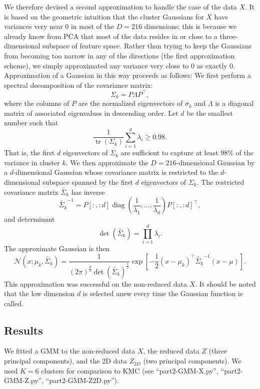 \documentclass[12pt]{article}
\begin{document}
We therefore devised a second approximation to handle the case of the data $X$. It is based on the geometric intuition that the cluster Gaussians for $X$ have variances very near $0$ in most of the $D=216$ dimensions; this is because we already know from PCA that most of the data resides in or close to a three-dimensional subspace of feature space. Rather than trying to keep the Gaussians from becoming too narrow in any of the directions (the first approximation scheme), we simply approximated any variance very close to $0$ as exactly $0$. Approximation of a Gaussian in this way proceeds as follows: We first perform a spectral decomposition of the covariance matrix:
\[ \Sigma_k = P \Lambda P^\top, \]
where the columns of $P$ are the normalized eigenvectors of $\sigma_k$ and $\Lambda$ is a diagonal matrix of associated eigenvalues in descending order. Let $d$ be the smallest number such that
\[ \frac{1}{\operatorname{tr}(\Sigma_k)}\sum_{i=1}^d \lambda_i \geq 0.98. \]
That is, the first $d$ eigenvectors of $\Sigma_k$ are sufficient to capture at least 98\% of the variance in cluster $k$. We then approximate the $D=216$-dimensional Gaussian by a $d$-dimensional Gaussian whose covariance matrix is restricted to the $d$-dimensional subspace spanned by the first $d$ eigenvectors of $\Sigma_k$. The restricted covariance matrix $\tilde{\Sigma_k}$ has inverse
\[ \tilde{\Sigma_k}^{-1} = P[:, :d] \operatorname{diag}\left(\frac{1}{\lambda_1},\ldots,\frac{1}{\lambda_d}\right) P[:, :d]^\top, \]
and determinant
\[ \operatorname{det}(\tilde{\Sigma_k}) = \prod_{i=1}^d \lambda_i. \]
The approximate Gaussian is then
\[ \mathcal{N}(x; \mu_k, \tilde{\Sigma_k}) = \frac{1}{(2\pi)^{\frac{d}{2}}\operatorname{det}(\tilde{\Sigma_k})^{\frac{1}{2}}}\exp\left[-\frac{1}{2}(x-\mu_k)^\top\tilde{\Sigma_k}^{-1}(x-\mu)\right]. \]
This approximation was successful on the non-reduced data $X$. It should be noted that the low dimension $d$ is selected anew every time the Gaussian function is called.

\subsection{Results}

We fitted a GMM to the non-reduced data $X$, the reduced data $Z$ (three principal components), and the 2D data $Z_{2D}$ (two principal components). We used $K=6$ clusters for comparison to KMC (see ``part2-GMM-X.py'', ``part2-GMM-Z.py'', ``part2-GMM-Z2D.py'').
\end{document}
